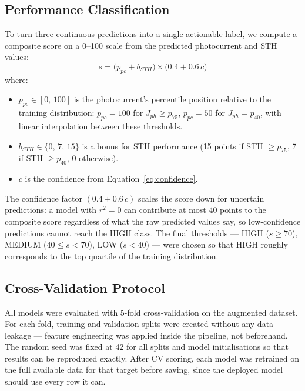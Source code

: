 \subsection{Performance Classification}\label{sec:classification}

To turn three continuous predictions into a single actionable label, we compute
a composite score on a 0--100 scale from the predicted photocurrent and STH values:
\begin{equation}
  s = \bigl(p_{pc} + b_{STH}\bigr)
      \times \bigl(0.4 + 0.6\,c\bigr)
  \label{eq:score}
\end{equation}
where:
\begin{itemize}
  \item $p_{pc} \in [0,\,100]$ is the photocurrent's percentile position
        relative to the training distribution: $p_{pc} = 100$ for
        $J_{ph} \geq p_{75}$, $p_{pc} = 50$ for $J_{ph} = p_{40}$,
        with linear interpolation between these thresholds.
  \item $b_{STH} \in \{0,\,7,\,15\}$ is a bonus for STH performance
        (15 points if STH $\geq p_{75}$, 7 if STH $\geq p_{40}$, 0 otherwise).
  \item $c$ is the confidence from Equation~\eqref{eq:confidence}.
\end{itemize}

The confidence factor $(0.4 + 0.6\,c)$ scales the score down for uncertain
predictions: a model with $r^2 = 0$ can contribute at most 40 points to the
composite score regardless of what the raw predicted values say, so low-confidence
predictions cannot reach the HIGH class.
The final thresholds --- HIGH ($s \geq 70$), MEDIUM ($40 \leq s < 70$),
LOW ($s < 40$) --- were chosen so that HIGH roughly corresponds to the top
quartile of the training distribution.

\subsection{Cross-Validation Protocol}

All models were evaluated with 5-fold cross-validation on the augmented dataset.
For each fold, training and validation splits were created without any data leakage ---
feature engineering was applied inside the pipeline, not beforehand.
The random seed was fixed at 42 for all splits and model initialisations so that
results can be reproduced exactly.
After CV scoring, each model was retrained on the full available data for that
target before saving, since the deployed model should use every row it can.

